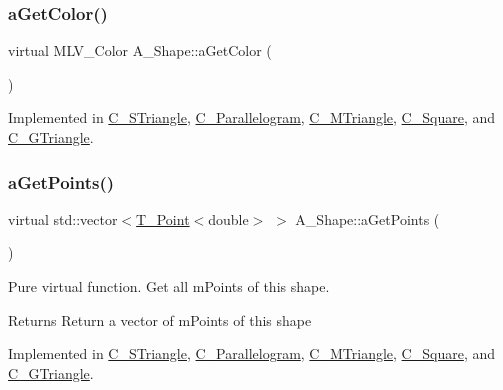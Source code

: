 \mbox{\label{classA__Shape_a1e90c8132d33e4ac84d42f72606193b2}} 
\subsubsection{\texorpdfstring{a\+Get\+Color()}{aGetColor()}}
{\footnotesize\ttfamily virtual M\+L\+V\+\_\+\+Color A\+\_\+\+Shape\+::a\+Get\+Color (\begin{DoxyParamCaption}{ }\end{DoxyParamCaption})\hspace{0.3cm}{\ttfamily [pure virtual]}}



Implemented in \hyperlink{classC__STriangle_a1a0c315653ece65118705648d09336dd}{C\+\_\+\+S\+Triangle}, \hyperlink{classC__Parallelogram_afd5055e948fcd992be3cdd227c8b4bfb}{C\+\_\+\+Parallelogram}, \hyperlink{classC__MTriangle_aa567d77ce0e6d664beb6eea9268b1bc3}{C\+\_\+\+M\+Triangle}, \hyperlink{classC__Square_a44b1e58b20cc98edc774a73742fec9a7}{C\+\_\+\+Square}, and \hyperlink{classC__GTriangle_a19100d603f9239fd66f1115c4358f0fc}{C\+\_\+\+G\+Triangle}.

\mbox{\label{classA__Shape_a9fd1285bd63b1fc88943c9969bf01a5c}} 
\subsubsection{\texorpdfstring{a\+Get\+Points()}{aGetPoints()}}
{\footnotesize\ttfamily virtual std\+::vector$<$\hyperlink{classT__Point}{T\+\_\+\+Point}$<$double$>$ $>$ A\+\_\+\+Shape\+::a\+Get\+Points (\begin{DoxyParamCaption}{ }\end{DoxyParamCaption})\hspace{0.3cm}{\ttfamily [pure virtual]}}



Pure virtual function. Get all m\+Points of this shape. 

\begin{DoxyReturn}{Returns}
Return a vector of m\+Points of this shape 
\end{DoxyReturn}


Implemented in \hyperlink{classC__STriangle_a8d144f4451fe2e5bf6f333d8c37f0f57}{C\+\_\+\+S\+Triangle}, \hyperlink{classC__Parallelogram_ae75f316315134020e8423feff917828e}{C\+\_\+\+Parallelogram}, \hyperlink{classC__MTriangle_ada409f8f1015cf7bf9f9ab8fb11da94b}{C\+\_\+\+M\+Triangle}, \hyperlink{classC__Square_aca738fec39149ed697f3d2413cd7cec2}{C\+\_\+\+Square}, and \hyperlink{classC__GTriangle_af3c514a6f5516c297374004a94788877}{C\+\_\+\+G\+Triangle}.

